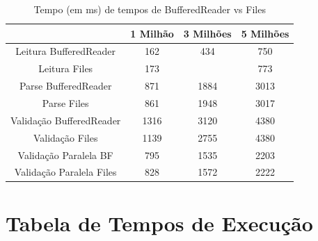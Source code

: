 \documentclass[a4paper]{report}
\begin{document}
\begin{table}[H]
    \begin{center}
        \begin{tabular}{| c | c | c | c |}
            \hline
            & 1 Milhão & 3 Milhões & 5 Milhões \\
            \hline
            Leitura BufferedReader & 162 & 434 & 750 \\
            \hline
            Leitura Files & 173 &  & 773 \\
            \hline
            Parse BufferedReader & 871 & 1884 & 3013 \\
            \hline
            Parse Files & 861 & 1948 & 3017 \\
            \hline
            Validação BufferedReader & 1316 & 3120 & 4380 \\
            \hline
            Validação Files & 1139 & 2755 & 4380 \\
            \hline
            Validação Paralela BF & 795 & 1535 & 2203 \\
            \hline
            Validação Paralela Files & 828 & 1572 & 2222 \\
            \hline

        \end{tabular}
        \caption{Tempo (em ms) de tempos de BufferedReader vs Files}
        \label{tab:BFvsF}
    \end{center}
\end{table}

\chapter{Tabela de Tempos de Execução}
\end{document}
